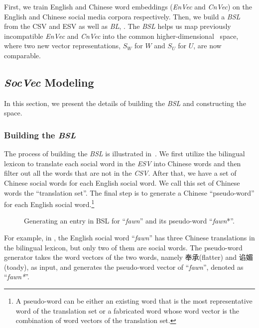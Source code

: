 First, we train English and 
Chinese word embeddings (\textit{EnVec} and \textit{CnVec}) 
on the English and Chinese social media corpora respectively. 
Then, 
we build a \textit{BSL}
from the CSV and ESV as well as \textit{BL}, . 
The \textit{BSL} helps us 
map previously incompatible \textit{EnVec} and \textit{CnVec} 
into the common higher-dimensional \textit{\socvec~}space,
where
two new vector representations, $S_W$ for $W$ and $S_U$ for $U$,
are now comparable.

\subsection{\textit{SocVec} Modeling}
\label{sec:model}
In this section, we present the details of building the \textit{BSL} 
and constructing the \textit{\socvec} space.

\subsubsection{Building the \textit{BSL}}
The process of building the \textit{BSL} is 
illustrated in~. 
We first utilize the bilingual lexicon to translate each social word 
in the \textit{ESV} into Chinese words and then filter out all the words 
that are not in the \textit{CSV}. After that, we have a set of 
Chinese social words for each English social word. 
We call this set of Chinese words the ``translation set''.
The final step is to generate a Chinese ``pseudo-word'' 
for each English social word.\footnote{A pseudo-word can be either 
an existing word that is the most representative word of the translation set 
or a fabricated word whose word vector is the combination of word vectors of
the translation set.}

\begin{figure}[th]
	\centering
	\caption{Generating an entry in BSL for ``\textit{fawn}'' 
		and its pseudo-word ``\textit{fawn}*''.}
	\label{fig:BSL}
\end{figure}

For example, in , the
English social word ``\textit{fawn}'' has three Chinese translations in the 
bilingual lexicon, but only two of them are social words. 
The pseudo-word generator takes the word vectors of the two words, namely
奉承(flatter) and 谄媚(toady), as input, and generates the pseudo-word 
vector of ``\textit{fawn}'', denoted as ``\textit{fawn*}''. 

